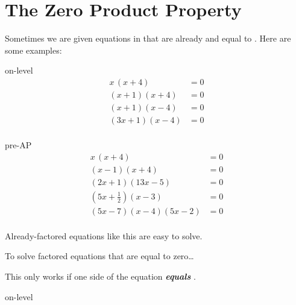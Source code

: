 \section*{The Zero Product Property}

Sometimes we are given equations in that are already  and equal to .
Here are some examples:
\begin{taggedblock}{on-level}
    \begin{align*}
        x\,(x+4)     &= 0  \\
        (x+1)(x+4)  &= 0  \\
        (x+1)(x-4)  &= 0  \\
        (3x+1)(x-4) &= 0  \\
    \end{align*}
\end{taggedblock}
\begin{taggedblock}{pre-AP}
    \begin{align*}
        x\,(x+4)     &= 0  \\
        (x-1)(x+4)  &= 0  \\
        (2x+1)(13x-5) &= 0  \\
        (5x+\frac{1}{2})(x-3) &= 0 \\
        (5x-7)(x-4)(5x-2) &= 0 \\
    \end{align*}
\end{taggedblock}

Already-factored equations like this  
are easy to solve.

\begin{myConceptSteps}{
    To solve factored equations that are equal to zero\dots
}
\end{myConceptSteps}

\begin{center}
    \begin{tcolorbox}[width=5in]
        This only works if one side of the equation 
        {\bfseries\itshape equals} .
    \end{tcolorbox}
\end{center}

\begin{taggedblock}{on-level}
    
\end{taggedblock}


